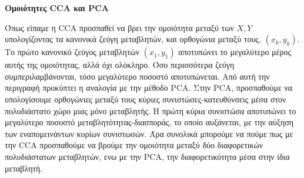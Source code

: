 \documentclass[11pt,a4paper,english,greek,twoside]{../Thesis}
\begin{document}

\textbf{Ομοιότητες CCA και PCA} 
\par Όπως είπαμε η CCA προσπαθεί να βρει την ομοιότητα μεταξύ των $X,Y$ υπολογίζοντας τα κανονικά ζεύγη μεταβλητών, και ορθογώνια μεταξύ τους, $(x_k,y_k)$. Το πρώτο κανονικό ζεύγος μεταβλητών $(x_1, y_1)$ αποτυπώνει το μεγαλύτερο μέρος αυτής της ομοιότητας, αλλά όχι ολόκληρο. Όσο περισσότερα ζεύγη συμπεριλαμβάνονται, τόσο μεγαλύτερο ποσοστό αποτυπώνεται. Από αυτή την περιγραφή προκύπτει η αναλογία με την μέθοδο PCA. Στην PCA, προσπαθούμε να υπολογίσουμε ορθογώνιες μεταξύ τους κύριες συνιστώσες-κατευθύνσεις μέσα στον πολυδιάστατο χώρο μιας μόνο μεταβλητής. Η πρώτη κύρια συνιστώσα αποτυπώνει το μεγαλύτερο ποσοστό μεταβλητότητας-διασποράς, το οποίο αυξάνεται, με την αύξηση των εναπομεινάντων κυρίων συνιστωσών. Άρα συνολικά μπορούμε να πούμε πως με την CCA προσπαθούμε να βρούμε την ομοιότητα μεταξύ δύο διαφορετικών πολυδιάστατων μεταβλητών, ενω με την PCA, την διαφορετικότητα μέσα στην ίδια μεταβλητή. %
\end{document}
